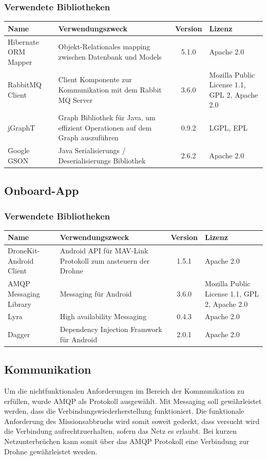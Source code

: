 \subsubsection{Verwendete Bibliotheken}
\begin{tabularx}{\textwidth}{|X|X|c|X|}
	\hline
	\textbf{Name} & \textbf{Verwendungszweck} & \textbf{Version} & \textbf{Lizenz} \\
	\hline \hline
	Hibernate ORM Mapper & Objekt-Relationales mapping zwischen Datenbank und Models  & 5.1.0 & Apache 2.0\\
	\hline 
	RabbitMQ Client & Client Komponente zur Kommunikation mit dem Rabbit MQ Server & 3.6.0 &  Mozilla Public License 1.1, GPL 2, Apache 2.0 \\
	\hline 
	jGraphT & Graph Bibliothek für Java, um effizient Operationen auf dem Graph auszuführen & 0.9.2 &  LGPL, EPL \\
	\hline 
	Google GSON & Java Serialisierungs / Deserialisierungs Bibliothek & 2.6.2 & Apache 2.0\\
	\hline 
\end{tabularx}

\subsection{Onboard-App}

\subsubsection{Verwendete Bibliotheken}
\begin{tabularx}{\textwidth}{|X|X|c|X|}
	\hline
	\textbf{Name} & \textbf{Verwendungszweck} & \textbf{Version} & \textbf{Lizenz} \\
	\hline \hline
	DroneKit-Android Client & Android API für MAV-Link Protokoll zum ansteuern der Drohne & 1.5.1 & Apache 2.0\\
	\hline 
	AMQP Messaging Library & Messaging für Android & 3.6.0 &  Mozilla Public License 1.1, GPL 2,  Apache 2.0 \\
	\hline 
	Lyra  & High availability Messaging & 0.4.3 &  Apache 2.0 \\
	\hline 
	Dagger  & Dependency Injection Framwork für Android & 2.0.1 &  Apache 2.0 \\
	\hline 
\end{tabularx}

\subsection{Kommunikation}
Um die nichtfunktionalen Anforderungen im Bereich der Kommunikation zu erfüllen, wurde AMQP als Protokoll ausgewählt. Mit Messaging soll gewährleistet werden, dass die Verbindungswiederherstellung funktioniert. Die funktionale Anforderung des Missionsabbruchs wird somit soweit gedeckt, dass versucht wird die Verbindung aufrechtzuerhalten, sofern das Netz es erlaubt. Bei kurzen Netzunterbrüchen kann somit über das AMQP Protokoll eine Verbindung zur Drohne gewährleistet werden.

